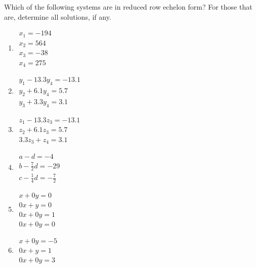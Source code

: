 \begin{exercise} \label{ex:} 
Which of the following systems are in reduced row echelon form?
For those that are, determine all solutions, if any.
\begin{enumerate}
\item \(\begin{array}{l}
x_1=-194\\
x_2=564\\
x_3=-38\\
x_4=275
\end{array}\)

\item \(\begin{array}{l}
y_1-13.3y_4=-13.1\\
y_2+6.1y_4=5.7\\
y_3+3.3y_4=3.1
\end{array}\)

\item \(\begin{array}{l}
z_1-13.3z_3=-13.1\\
z_2+6.1z_3=5.7\\
3.3z_3+z_4=3.1
\end{array}\)

\item \(\begin{array}{l}a-d=-4\\
b-\frac72d=-29\\
c-\frac14d=-\frac72
\end{array}\)

\item \(\begin{array}{l}x+0y=0\\
0x+y=0\\
0x+0y=1\\
0x+0y=0
\end{array}\)

\item \(\begin{array}{l}x+0y=-5\\
0x+y=1\\
0x+0y=3
\end{array}\)

%
%
\end{enumerate}
\end{exercise}




